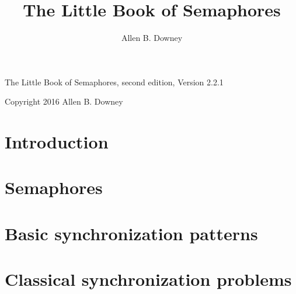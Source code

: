 \documentclass{book}
\title{The Little Book of Semaphores}
\author{Allen B. Downey}
\newcommand{\theversion}{Version 2.2.1}
\newcommand{\clearemptydoublepage}{\newpage\cleardoublepage}
\newif\ifnotcompact
\def \localizationPath {en/}
\begin{document}
\maketitle

\ifnotcompact
\frontmatter

\chapter{Preface}



\else
\null
\fi

\vfill

\begin{center}
The Little Book of Semaphores, second edition, \theversion
\vspace{0.25in}

Copyright 2016 Allen B. Downey
\end{center}
\vspace{0.25in}



\ifnotcompact
\else
\frontmatter
\fi

\tableofcontents
\clearemptydoublepage

\mainmatter


\chapter{Introduction}



\chapter{Semaphores}



\chapter{Basic synchronization patterns}



\clearemptydoublepage
\chapter{Classical synchronization problems}
\end{document}
